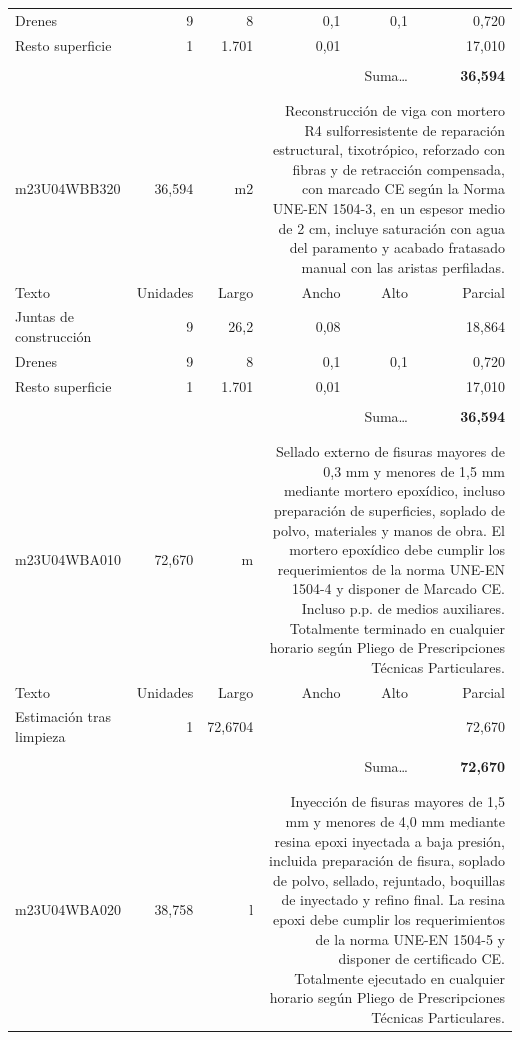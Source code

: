 \documentclass{book}%
\begin{document}
\begin{longtable}{lrrrrr}
\multicolumn{1}{p{3.5cm}}{Drenes}&9&8&0,1&0,1&     0,720\\%
\multicolumn{1}{p{3.5cm}}{Resto superficie}&1&1.701&0,01&&    17,010\\%
&&&&&\\%
\multicolumn{5}{r}{Suma\ldots}&\textbf{    36,594}\\%
\hline%
&&&&&\\%
&&&&&\\%
m23U04WBB320&    36,594& m2&\multicolumn{3}{p{6cm}}{\scriptsize Reconstrucción de viga con mortero R4 sulforresistente de reparación estructural, tixotrópico, reforzado con fibras y de retracción compensada, con marcado CE según la Norma UNE-EN 1504-3, en un espesor medio de 2 cm, incluye saturación con agua del paramento y acabado fratasado manual con las aristas perfiladas.\normalsize}\\%
Texto&Unidades&Largo&Ancho&Alto&Parcial\\%
\hline%
\multicolumn{1}{p{3.5cm}}{Juntas de construcción}&9&26,2&0,08&&    18,864\\%
\multicolumn{1}{p{3.5cm}}{Drenes}&9&8&0,1&0,1&     0,720\\%
\multicolumn{1}{p{3.5cm}}{Resto superficie}&1&1.701&0,01&&    17,010\\%
&&&&&\\%
\multicolumn{5}{r}{Suma\ldots}&\textbf{    36,594}\\%
\hline%
&&&&&\\%
&&&&&\\%
m23U04WBA010&    72,670& m&\multicolumn{3}{p{6cm}}{\scriptsize Sellado externo de fisuras mayores de 0,3 mm y menores de 1,5 mm mediante mortero epoxídico, incluso preparación de superficies, soplado de polvo, materiales y manos de obra. El mortero epoxídico debe cumplir los requerimientos de la norma UNE-EN 1504-4 y disponer de Marcado CE. Incluso p.p. de medios auxiliares. Totalmente terminado en cualquier horario según Pliego de Prescripciones Técnicas Particulares.\normalsize}\\%
Texto&Unidades&Largo&Ancho&Alto&Parcial\\%
\hline%
\multicolumn{1}{p{3.5cm}}{Estimación tras limpieza}&1&72,6704&&&    72,670\\%
&&&&&\\%
\multicolumn{5}{r}{Suma\ldots}&\textbf{    72,670}\\%
\hline%
&&&&&\\%
&&&&&\\%
m23U04WBA020&    38,758& l&\multicolumn{3}{p{6cm}}{\scriptsize Inyección de fisuras mayores de 1,5 mm y menores de 4,0 mm mediante resina epoxi inyectada a baja presión, incluida preparación de fisura, soplado de polvo, sellado, rejuntado, boquillas de inyectado y refino final. La resina epoxi debe cumplir los requerimientos de la norma UNE-EN 1504-5 y disponer de certificado CE. Totalmente ejecutado en cualquier horario según Pliego de Prescripciones Técnicas Particulares.\normalsize}\\%

\end{longtable}
\end{document}
